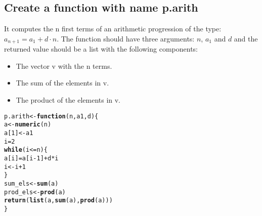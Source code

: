 \documentclass{article}\usepackage[]{graphicx}\usepackage[]{xcolor}
\makeatletter
\newcommand{\hlnum}[1]{\textcolor[rgb]{0.686,0.059,0.569}{#1}}%
\newcommand{\hlopt}[1]{\textcolor[rgb]{0,0,0}{#1}}%
\newcommand{\hldef}[1]{\textcolor[rgb]{0.345,0.345,0.345}{#1}}%
\newcommand{\hlkwa}[1]{\textcolor[rgb]{0.161,0.373,0.58}{\textbf{#1}}}%
\newcommand{\hlkwb}[1]{\textcolor[rgb]{0.69,0.353,0.396}{#1}}%
\newcommand{\hlkwc}[1]{\textcolor[rgb]{0.333,0.667,0.333}{#1}}%
\newcommand{\hlkwd}[1]{\textcolor[rgb]{0.737,0.353,0.396}{\textbf{#1}}}%
\newenvironment{kframe}{%
 \def\at@end@of@kframe{}%
 \ifinner\ifhmode%
  \def\at@end@of@kframe{\end{minipage}}%
  \begin{minipage}{\columnwidth}%
 \fi\fi%
 \def\FrameCommand##1{\hskip\@totalleftmargin \hskip-\fboxsep
 \colorbox{shadecolor}{##1}\hskip-\fboxsep
     \hskip-\linewidth \hskip-\@totalleftmargin \hskip\columnwidth}%
 \MakeFramed {\advance\hsize-\width
   \@totalleftmargin\z@ \linewidth\hsize
   \@setminipage}}%
 {\par\unskip\endMakeFramed%
 \at@end@of@kframe}
\newenvironment{knitrout}{}{} %
\makeatother
\begin{document}
\subsection{Create a function with name p.arith} 
It computes the n first terms of an arithmetic progression of the type: $a_{n+1} = a_1 + d \cdot n$. 
The function should have three arguments: $n$, $a_1$ and $d$ and the returned value should be a list with the following components:
\begin{itemize}
  \item {The vector v with the n terms.}
  \item {The sum of the elements in v.}
  \item {The product of the elements in v.}
\end{itemize}
\begin{knitrout}
\color{fgcolor}\begin{kframe}
\begin{alltt}
\hldef{p.arith}\hlkwb{<-}\hlkwa{function}\hldef{(}\hlkwc{n}\hldef{,} \hlkwc{a1}\hldef{,} \hlkwc{d}\hldef{)\{}
  \hldef{a}\hlkwb{<-}\hlkwd{numeric}\hldef{(n)}
  \hldef{a[}\hlnum{1}\hldef{]}\hlkwb{<-}\hldef{a1}
  \hldef{i}\hlkwb{=}\hlnum{2}
  \hlkwa{while} \hldef{(i}\hlopt{<=}\hldef{n)\{}
    \hldef{a[i]}\hlkwb{=}\hldef{a[i}\hlopt{-}\hlnum{1}\hldef{]}\hlopt{+}\hldef{d}\hlopt{*}\hldef{i}
    \hldef{i}\hlkwb{<-}\hldef{i}\hlopt{+}\hlnum{1}
  \hldef{\}}
  \hldef{sum_els}\hlkwb{<-}\hlkwd{sum}\hldef{(a)}
  \hldef{prod_els}\hlkwb{<-}\hlkwd{prod}\hldef{(a)}
  \hlkwd{return} \hldef{(}\hlkwd{list}\hldef{(a,} \hlkwd{sum}\hldef{(a),} \hlkwd{prod}\hldef{(a)))}
\hldef{\}}
\end{alltt}
\end{kframe}
\end{knitrout}
\end{document}
